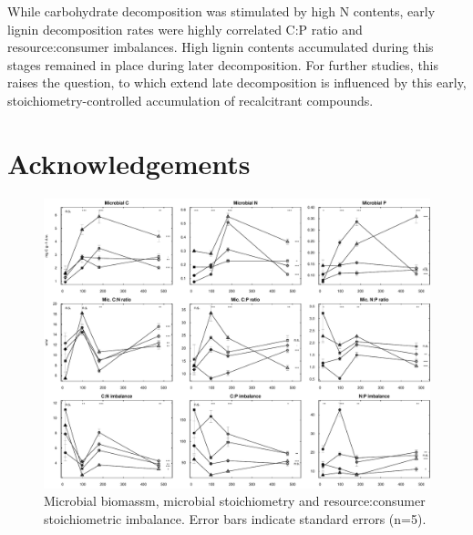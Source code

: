 \documentclass[authoryear,preprint,review,12pt]{elsarticle}
\begin{document}
While carbohydrate decomposition was stimulated by high N contents, early lignin decomposition rates were highly correlated C:P ratio and resource:consumer imbalances. High lignin contents accumulated during this stages remained in place during later decomposition. For further studies, this raises the question, to which extend late decomposition is influenced by this early, stoichiometry-controlled accumulation of recalcitrant compounds.

\section{Acknowledgements}




\newpage
\begin{figure}[h!s]
\vspace*{2mm}
\begin{center}
\includegraphics{sbb-mb}
\end{center}
\caption{Microbial biomassm, microbial stoichiometry and resource:consumer stoichiometric imbalance. Error bars indicate standard errors (n=5).}
\label{fig:mb}
\end{figure}
\end{document}
